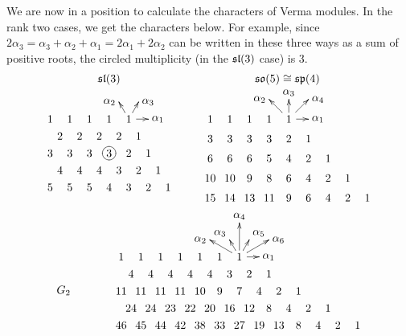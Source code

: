  \begin{example}\label{lec18Eg:Verma}
   We are now in a position to calculate the characters of Verma modules. In the rank
   two cases, we get the characters below. For example, since $2\alpha_3 =
   \alpha_3+\alpha_2+\alpha_1 = 2\alpha_1+2\alpha_2$ can be written in these three
   ways as a sum of positive roots, the circled multiplicity (in the $\sl(3)$ case) is
   3.
   \[\begin{array}{cc}
    \sl(3) & \so(5)\cong \sp(4)\\
    \quad \begin{xy}<1.75em,0em>: (-1,0):a(120):: %
      {\ar (0,0) *++{\,};(-1,0) *+!L{\alpha_1}
       \ar (0,0) *++{\,};(0,-1) *+!R{\alpha_2}
       \ar (0,0) *++{\,};(-1,-1) *+!L{\alpha_3}},
       (4,0) *{1},(3,0) *{1},(2,0) *{1},(1,0) *{1},(0,0) *{1},
       (4,1) *{2},(3,1) *{2},(2,1) *{2},(1,1) *{2},(0,1) *{1},
       (5,2) *{3},(4,2) *{3},(3,2) *{3},(2,2) *\cir<6pt>{} *{3},(1,2) *{2},(0,2) *{1},
       (5,3) *{4},(4,3) *{4},(3,3) *{4},(2,3) *{3},(1,3) *{2},(0,3) *{1},
       (6,4) *{5},(5,4) *{5},(4,4) *{5},(3,4) *{4},(2,4) *{3},(1,4) *{2},(0,4) *{1},
    \end{xy}
    \quad & \quad
    \begin{xy}<1.75em,0em>: (-1,0):(-1,1):: %
      {\ar (0,0) *++{\,};(-1,0)  *+!L{\alpha_1}
       \ar (0,0) *++{\,};(0,-1) *+!R{\alpha_2}
       \ar (0,0) *++{\,};(-1,-1) *+!D{\alpha_3}
       \ar (0,0) *++{\,};(-2,-1) *+!L{\alpha_4}},
       (4,0) *{1},(3,0) *{1},(2,0) *{1},(1,0) *{1},(0,0) *{1},
       (5,1) *{3},(4,1) *{3},(3,1) *{3},(2,1) *{3},(1,1) *{2},(0,1) *{1},
       (6,2) *{6},(5,2) *{6},(4,2) *{6},(3,2) *{5},(2,2) *{4},(1,2) *{2},(0,2) *{1},
       (7,3) *{10},(6,3) *{10},(5,3) *{9},(4,3) *{8},(3,3) *{6},(2,3) *{4},(1,3) *{2},(0,3) *{1},
       (8,4) *{15},(7,4) *{14},(6,4) *{13},(5,4) *{11},(4,4) *{9},(3,4) *{6},(2,4) *{4},(1,4) *{2},(0,4) *{1},
    \end{xy}\quad
    \end{array}\]
    \[\raisebox{-3em}{\mbox{$G_2$}} \qquad \qquad
    \begin{xy}<1.75em,0em>: (-1,0):a(120)+(-1,0):: %
      {\ar (0,0) *++{\,};(-1,0)  *+!L{\alpha_1}
       \ar (0,0) *++{\,};(0,-1) *+!R{\alpha_2}
       \ar (0,0) *++{\,};(-1,-1) *+!DR{\alpha_3}
       \ar (0,0) *++{\,};(-3,-2) *+!D{\alpha_4}
       \ar (0,0) *++{\,};(-2,-1) *+!DL{\alpha_5}
       \ar (0,0) *++{\,};(-3,-1) *+!L{\alpha_6}},
       (6,0) *{1},(5,0) *{1},(4,0) *{1},(3,0) *{1},(2,0) *{1},(1,0) *{1},(0,0) *{1},
       (7,1) *{4},(6,1) *{4},(5,1) *{4},(4,1) *{4},(3,1) *{4},(2,1) *{3},(1,1) *{2},(0,1) *{1},
       (9,2) *{11},(8,2) *{11},(7,2) *{11},(6,2) *{11},(5,2) *{10},(4,2) *{9},(3,2) *{7},(2,2) *{4},(1,2) *{2},(0,2) *{1},
       (10,3) *{24},(9,3) *{24},(8,3) *{23},(7,3) *{22},(6,3) *{20},(5,3) *{16},(4,3) *{12},(3,3) *{8},(2,3) *{4},(1,3) *{2},(0,3) *{1},
       (12,4) *{46},(11,4) *{45},(10,4) *{44},(9,4) *{42},(8,4) *{38},(7,4) *{33},(6,4) *{27},(5,4) *{19},(4,4) *{13},(3,4) *{8},(2,4) *{4},(1,4) *{2},(0,4) *{1},
    \end{xy}
   \]
 \end{example}
